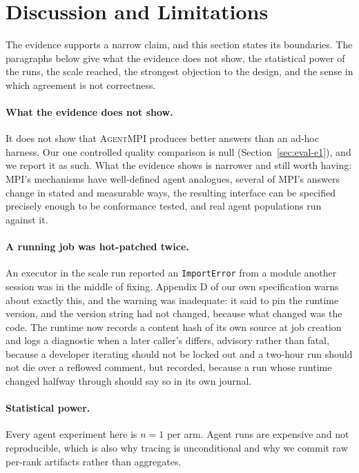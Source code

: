 \documentclass[sigconf,nonacm]{acmart}
\newcommand{\ampi}{\textsc{AgentMPI}\xspace}
\newcommand{\code}[1]{\texttt{\small #1}}
\begin{document}
\section{Discussion and Limitations}
\label{sec:discussion}

The evidence supports a narrow claim, and this section states its boundaries.
The paragraphs below give what the evidence does not show, the statistical
power of the runs, the scale reached, the strongest objection to the design, and
the sense in which agreement is not correctness.

\paragraph{What the evidence does not show.} It does not show that \ampi
produces better answers than an ad-hoc harness. Our one controlled quality
comparison is null (Section~\ref{sec:eval-e1}), and we report it as such. What
the evidence shows is narrower and still worth having: MPI's mechanisms have
well-defined agent analogues, several of MPI's answers change in stated and
measurable ways, the resulting interface can be specified precisely enough to be
conformance tested, and real agent populations run against it.

\paragraph{A running job was hot-patched twice.} An executor in the scale run
reported an \code{ImportError} from a module another session was in the middle
of fixing. Appendix D of our own specification warns about exactly this, and the
warning was inadequate: it said to pin the runtime version, and the version string
had not changed, because what changed was the code. The runtime now records a
content hash of its own source at job creation and logs a diagnostic when a later
caller's differs, advisory rather than fatal, because a developer iterating
should not be locked out and a two-hour run should not die over a reflowed
comment, but recorded, because a run whose runtime changed halfway through should
say so in its own journal.

\paragraph{Statistical power.} Every agent experiment here is $n=1$ per arm.
Agent runs are expensive and not reproducible, which is also why tracing is
unconditional and why we commit raw per-rank artifacts rather than aggregates.
\end{document}
